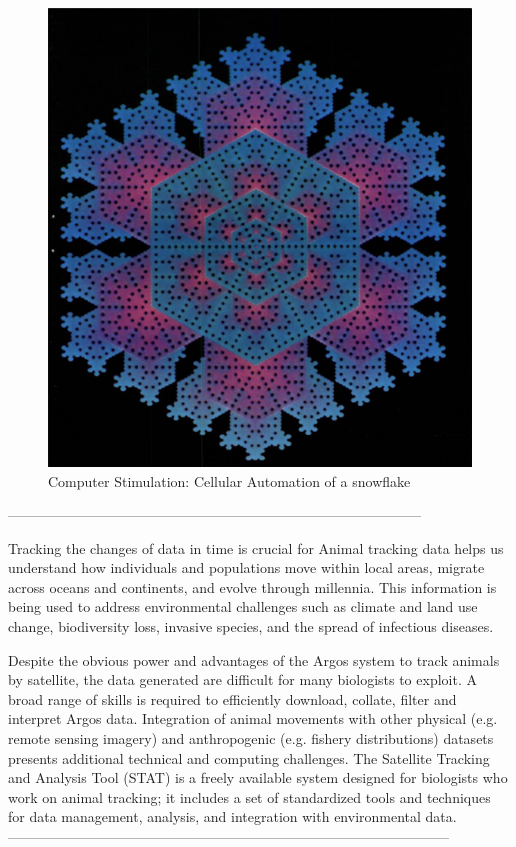\begin{figure}[h]
\centering
\includegraphics[scale=0.6]{images/snowflake_algorithm}
\caption{Computer Stimulation: Cellular Automation of a snowflake}
\label{fig:snowflake}
\end{figure}

-----------------------------------------------------------------------------------------

Tracking the changes of data in time is crucial for
Animal tracking data helps us understand how individuals and populations move within local areas, migrate across oceans and continents, and evolve through millennia. This information is being used to address environmental challenges such as climate and land use change, biodiversity loss, invasive species, and the spread of infectious diseases.

Despite the obvious power and advantages
of the Argos system to track animals by satellite,
the data generated are difficult for many biologists to
exploit. A broad range of skills is required to efficiently
download, collate, filter and interpret Argos data. Integration
of animal movements with other physical (e.g.
remote sensing imagery) and anthropogenic (e.g. fishery
distributions) datasets presents additional technical
and computing challenges. The Satellite Tracking and
Analysis Tool (STAT) is a freely available system designed
for biologists who work on animal tracking; it
includes a set of standardized tools and techniques for
data management, analysis, and integration with environmental
data.\cite{coyne2005satellite}
-----------------------------------------------------------------------------------------------

